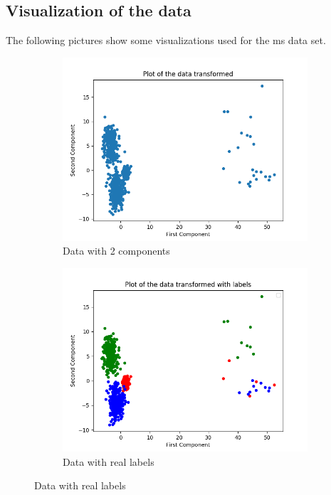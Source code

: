 \documentclass[12pt]{article}
\begin{document}
\subsection{Visualization of the data}\label{MSData:Vis}
The following pictures show some visualizations used for the ms data set.

\begin{figure}[H]
     \centering
     \begin{subfigure}[b]{0.4\textwidth}
         \centering
         \includegraphics[width=\textwidth]{Figure_1.png}
         \caption{Data with 2 components}
     \end{subfigure}
     \hfill
     \begin{subfigure}[b]{0.4\textwidth}
         \centering
         \includegraphics[width=\textwidth]{Figure_26.png}
         \caption{Data with real labels}
     \end{subfigure}
\end{figure}
\end{document}
